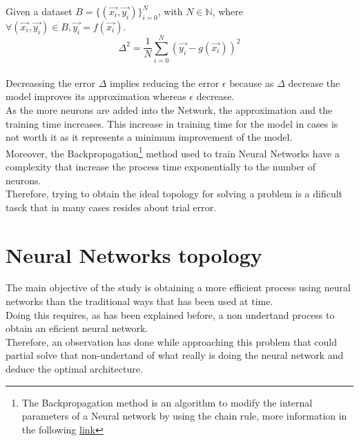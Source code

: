 \documentclass[a4paper, 11pt]{article}
\begin{document}
Given a dataset $B = \{(\vec{x_i},\vec{y_i})\}_{i=0}^{N}$, with $N \in \mathbb{N}$, where $\forall (\vec{x_i},\vec{y_i}) \in B, \vec{y_i} = f(\vec{x_i})$.
$$\Delta^2 = \frac{1}{N} \sum_{i=0}^{N} \left( \vec{y_i} - g(\vec{x_i}) \right)^2$$
\hline\\\vspace{0.5em}
\hspace{-1.6em}Decreassing the error $\Delta$ implies reducing the error $\epsilon$ because as $\Delta$ decrease the model improves its approximation whereas $\epsilon$ decrease.\\
As the more neurons are added into the Network, the approximation and the training time increases. This increase in training time for the model in cases is not worth it as it represents a minimum improvement of the model.\\
Moreover, the Backpropagation\footnote{The Backpropagation method is an algorithm to modify the internal parameters of a Neural network by using the chain rule, more information in the following \href{https://en.wikipedia.org/wiki/Backpropagation}{link}} method used to train Neural Networks have a complexity that increase the process time exponentially to the number of neurons.\\
Therefore, trying to obtain the ideal topology for solving a problem is a dificult tasck that in many cases resides about trial error.
\newpage 
\section{Neural Networks topology}
The main objective of the study is obtaining a more efficient process using neural networks than the traditional ways that has been used at time.\\
Doing this requires, as has been explained before, a non undertand process to obtain an eficient neural network.\\
Therefore, an observation has done while approaching this problem that could partial solve that non-undertand of what really is doing the neural network and deduce the optimal architecture. 
\end{document}
